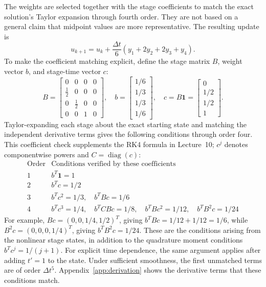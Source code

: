 \documentclass{article}
\begin{document}
The weights are selected together with the stage coefficients to match the exact solution's Taylor expansion through fourth order. They are not based on a general claim that midpoint values are more representative. The resulting update is
\[
u_{k+1}=u_k+\frac{\Delta t}{6}(y_1+2y_2+2y_3+y_4).
\]
To make the coefficient matching explicit, define the stage matrix $B$, weight vector $b$, and stage-time vector $c$:
\[
B=\begin{bmatrix}0&0&0&0\\ \tfrac12&0&0&0\\0&\tfrac12&0&0\\0&0&1&0\end{bmatrix},\quad
b=\begin{bmatrix}1/6\\1/3\\1/3\\1/6\end{bmatrix},\quad
c=B\mathbf{1}=\begin{bmatrix}0\\1/2\\1/2\\1\end{bmatrix}.
\]
Taylor-expanding each stage about the exact starting state and matching the independent derivative terms gives the following conditions through order four. This coefficient check supplements the RK4 formula in Lecture~10; $c^j$ denotes componentwise powers and $C=\operatorname{diag}(c)$:
\[
\begin{array}{c|l}
\text{Order}&\text{Conditions verified by these coefficients}\\\hline
1&b^T\mathbf{1}=1\\
2&b^Tc=1/2\\
3&b^Tc^2=1/3,\quad b^TBc=1/6\\
4&b^Tc^3=1/4,\quad b^TCBc=1/8,\quad b^TBc^2=1/12,\quad b^TB^2c=1/24
\end{array}
\]
For example, $Bc=(0,0,1/4,1/2)^T$, giving $b^TBc=1/12+1/12=1/6$, while $B^2c=(0,0,0,1/4)^T$, giving $b^TB^2c=1/24$. These are the conditions arising from the nonlinear stage states, in addition to the quadrature moment conditions $b^Tc^j=1/(j+1)$. For explicit time dependence, the same argument applies after adding $t'=1$ to the state. Under sufficient smoothness, the first unmatched terms are of order $\Delta t^5$. Appendix~\ref{app:derivation} shows the derivative terms that these conditions match.

\end{document}
